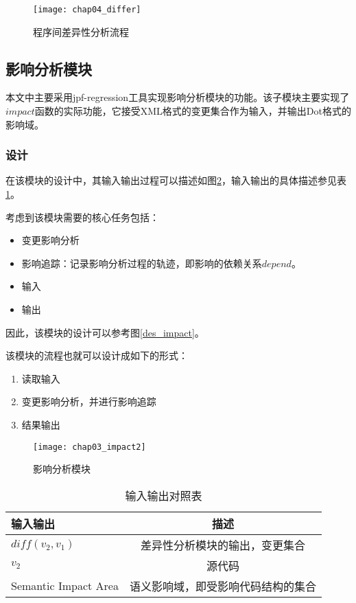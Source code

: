 \begin{figure}[H]
	\centering
	\texttt{[image: chap04\_differ]}
	\caption {程序间差异性分析流程}
	\label {diff}	
\end{figure}

\subsection{影响分析模块}

本文中主要采用jpf-regression工具实现影响分析模块的功能。该子模块主要实现了$impact$函数的实际功能，它接受XML格式的变更集合作为输入，并输出Dot格式的影响域。

\subsubsection{设计}

在该模块的设计中，其输入输出过程可以描述如图\ref {impact}，输入输出的具体描述参见表\ref {impact_io}。

考虑到该模块需要的核心任务包括：
\begin{itemize}
	\item 变更影响分析
	\item 影响追踪：记录影响分析过程的轨迹，即影响的依赖关系$depend$。
	\item 输入
	\item 输出
\end{itemize}

因此，该模块的设计可以参考图\ref {des_impact}。

该模块的流程也就可以设计成如下的形式：
\begin{enumerate}
	\item 读取输入
	\item 变更影响分析，并进行影响追踪
	\item 结果输出
\end{enumerate}

\begin{figure}[H]
	\centering
	\texttt{[image: chap03\_impact2]}
	\caption {影响分析模块}
	\label {impact}	
\end{figure}


\begin{table}[H]
	\caption{输入输出对照表}
	\label{impact_io}
	\centering
	\begin{tabular}{lc}
		\toprule[1.5pt]
		{\heiti 输入输出} & {\heiti 描述} \\\midrule[1pt]
		$diff(v_2,v_1)$ & 差异性分析模块的输出，变更集合 \\
		$v_2$ & 源代码 \\
		Semantic Impact Area & 语义影响域，即受影响代码结构的集合\\
		\bottomrule[1.5pt]
	\end{tabular}
\end{table}

